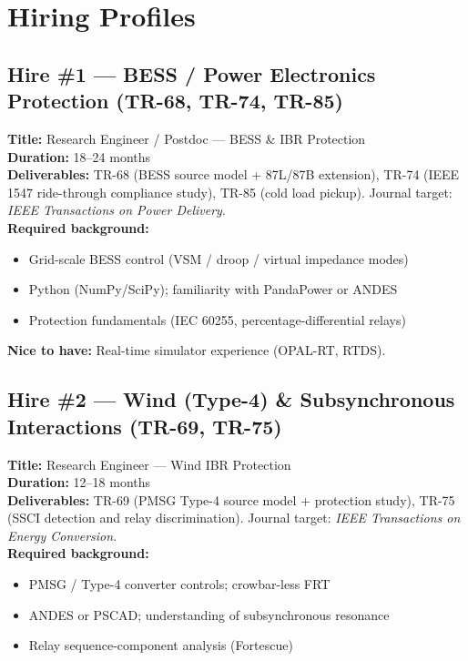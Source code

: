 \documentclass[11pt, a4paper]{article}
\begin{document}
\section{Hiring Profiles}
\label{sec:hiring}

\subsection{Hire \#1 — BESS / Power Electronics Protection (TR-68, TR-74, TR-85)}

\begin{infobox}
\textbf{Title:} Research Engineer / Postdoc — BESS \& IBR Protection \\[4pt]
\textbf{Duration:} 18--24 months \\[4pt]
\textbf{Deliverables:} TR-68 (BESS source model + 87L/87B extension),
TR-74 (IEEE 1547 ride-through compliance study),
TR-85 (cold load pickup).
Journal target: \textit{IEEE Transactions on Power Delivery}. \\[4pt]
\textbf{Required background:}
\begin{itemize}
  \item Grid-scale BESS control (VSM / droop / virtual impedance modes)
  \item Python (NumPy/SciPy); familiarity with PandaPower or ANDES
  \item Protection fundamentals (IEC 60255, percentage-differential relays)
\end{itemize}
\textbf{Nice to have:} Real-time simulator experience (OPAL-RT, RTDS).
\end{infobox}

\subsection{Hire \#2 — Wind (Type-4) \& Subsynchronous Interactions (TR-69, TR-75)}

\begin{infobox}
\textbf{Title:} Research Engineer — Wind IBR Protection \\[4pt]
\textbf{Duration:} 12--18 months \\[4pt]
\textbf{Deliverables:} TR-69 (PMSG Type-4 source model + protection study),
TR-75 (SSCI detection and relay discrimination).
Journal target: \textit{IEEE Transactions on Energy Conversion}. \\[4pt]
\textbf{Required background:}
\begin{itemize}
  \item PMSG / Type-4 converter controls; crowbar-less FRT
  \item ANDES or PSCAD; understanding of subsynchronous resonance
  \item Relay sequence-component analysis (Fortescue)
\end{itemize}
\end{infobox}
\end{document}
